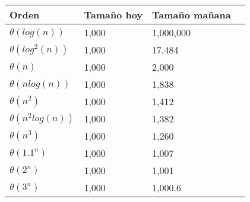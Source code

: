 \documentclass[12pt]{article}
\begin{document}
\begin{itemize}
\begin{tabular}{ | l | l | l | l  |}
  \hline
Orden   & Tamaño hoy  &  Tamaño mañana\\
  \hline
$\theta(log(n))$  & 1,000    & 1,000,000\\
$\theta(log^2(n))$ & 1,000   &    17,484\\
$\theta(n)$       & 1,000    &     2,000\\
$\theta(nlog(n))$   & 1,000  &     1,838\\
$\theta(n^2)$     & 1,000    &     1,412\\
$\theta(n^2log(n))$ & 1,000  &     1,382\\
$\theta(n^3)$     & 1,000    &     1,260\\ 
$\theta(1.1^n )$  & 1,000    &     1,007\\
$\theta(2^n)$     & 1,000    &     1,001\\
$\theta(3^n)$     & 1,000    &   1,000.6\\ 
  \hline  
\end{tabular}

\end{itemize}
\end{document}
